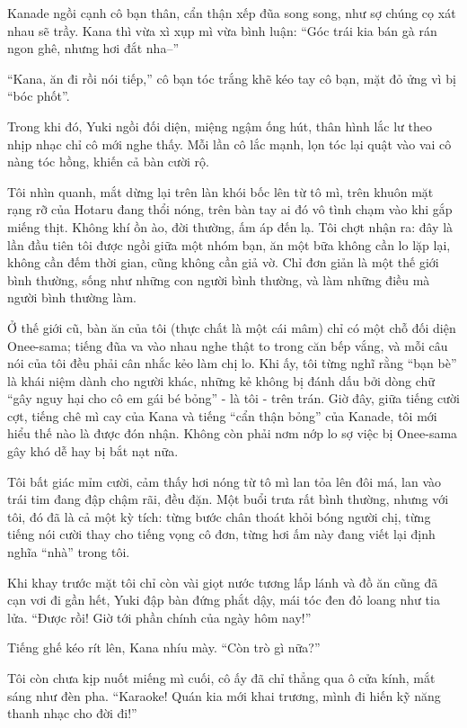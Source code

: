 \documentclass[../main.tex]{subfiles}
\begin{document}
Kanade ngồi cạnh cô bạn thân, cẩn thận xếp đũa song song, như sợ chúng cọ xát nhau sẽ trầy. Kana thì vừa xì xụp mì vừa bình luận: ``Góc trái kia bán gà rán ngon ghê, nhưng hơi đắt nha--''

``Kana, ăn đi rồi nói tiếp,'' cô bạn tóc trắng khẽ kéo tay cô bạn, mặt đỏ ửng vì bị ``bóc phốt''.

Trong khi đó, Yuki ngồi đối diện, miệng ngậm ống hút, thân hình lắc lư theo nhịp nhạc chỉ cô mới nghe thấy. Mỗi lần cô lắc mạnh, lọn tóc lại quật vào vai cô nàng tóc hồng, khiến cả bàn cười rộ.

Tôi nhìn quanh, mắt dừng lại trên làn khói bốc lên từ tô mì, trên khuôn mặt rạng rỡ của Hotaru đang thổi nóng, trên bàn tay ai đó vô tình chạm vào khi gắp miếng thịt. Không khí ồn ào, đời thường, ấm áp đến lạ. Tôi chợt nhận ra: đây là lần đầu tiên tôi được ngồi giữa một nhóm bạn, ăn một bữa không cần lo lặp lại, không cần đếm thời gian, cũng không cần giả vờ. Chỉ đơn giản là một thế giới bình thường, sống như những con người bình thường, và làm những điều mà người bình thường làm.

Ở thế giới cũ, bàn ăn của tôi (thực chất là một cái mâm) chỉ có một chỗ đối diện Onee-sama; tiếng đũa va vào nhau nghe thật to trong căn bếp vắng, và mỗi câu nói của tôi đều phải cân nhắc kẻo làm chị lo. Khi ấy, tôi từng nghĩ rằng ``bạn bè'' là khái niệm dành cho người khác, những kẻ không bị đánh dấu bởi dòng chữ ``gây nguy hại cho cô em gái bé bỏng'' - là tôi - trên trán. Giờ đây, giữa tiếng cười cợt, tiếng chê mì cay của Kana và tiếng ``cẩn thận bỏng'' của Kanade, tôi mới hiểu thế nào là được đón nhận. Không còn phải nơm nớp lo sợ việc bị Onee-sama gây khó dễ hay bị bắt nạt nữa.

Tôi bất giác mỉm cười, cảm thấy hơi nóng từ tô mì lan tỏa lên đôi má, lan vào trái tim đang đập chậm rãi, đều đặn. Một buổi trưa rất bình thường, nhưng với tôi, đó đã là cả một kỳ tích: từng bước chân thoát khỏi bóng người chị, từng tiếng nói cười thay cho tiếng vọng cô đơn, từng hơi ấm này đang viết lại định nghĩa ``nhà'' trong tôi.

\ct

Khi khay trước mặt tôi chỉ còn vài giọt nước tương lấp lánh và đồ ăn cũng đã cạn vơi đi gần hết, Yuki đập bàn đứng phắt dậy, mái tóc đen đỏ loang như tia lửa. ``Được rồi! Giờ tới phần chính của ngày hôm nay!''

Tiếng ghế kéo rít lên, Kana nhíu mày. ``Còn trò gì nữa?''

Tôi còn chưa kịp nuốt miếng mì cuối, cô ấy đã chỉ thẳng qua ô cửa kính, mắt sáng như đèn pha. ``Karaoke! Quán kia mới khai trương, mình đi hiến kỹ năng thanh nhạc cho đời đi!''
\end{document}
